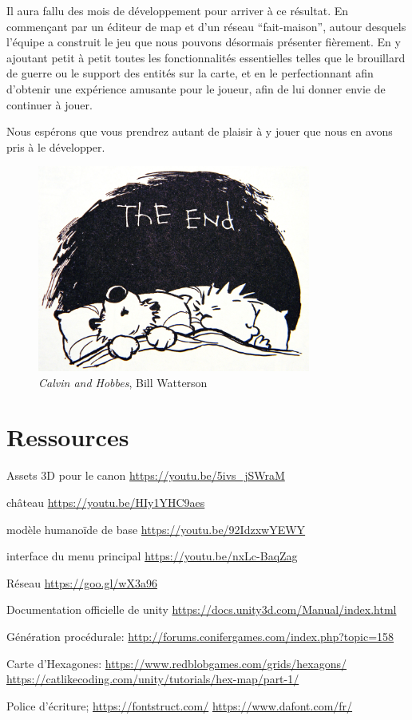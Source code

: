 \documentclass[12pt]{report}
\begin{document}
Il aura fallu des mois de développement pour arriver à ce résultat. En commençant
 par un éditeur de map et d’un réseau “fait-maison”, autour desquels l’équipe a
 construit le jeu que nous pouvons désormais présenter fièrement. En y ajoutant 
petit à petit toutes les fonctionnalités essentielles telles que le brouillard de guerre
 ou le support des entités sur la carte, et en le perfectionnant afin d’obtenir une
 expérience amusante pour le joueur, afin de lui donner envie de continuer à jouer.

Nous espérons que vous prendrez autant de plaisir à y jouer que nous en avons pris 
à le développer.


\begin{figure}
    \centering
    \includegraphics[width=0.8\textwidth]{project_mood}
    \caption*{\textit{Calvin and Hobbes}, Bill Watterson}
\end{figure}

\chapter{Ressources}

Assets 3D
pour le canon
\url{https://youtu.be/5ivs_jSWraM}

château
\url{https://youtu.be/HIy1YHC9aes}

modèle humanoïde de base
\url{https://youtu.be/92IdzxwYEWY}

interface du menu principal
\url{https://youtu.be/nxLc-BaqZag}

Réseau
\url{https://goo.gl/wX3a96}

Documentation officielle de unity
\url{https://docs.unity3d.com/Manual/index.html}

Génération procédurale:
\url{http://forums.conifergames.com/index.php?topic=158}

Carte d’Hexagones:
\url{https://www.redblobgames.com/grids/hexagons/}
\url{https://catlikecoding.com/unity/tutorials/hex-map/part-1/}

Police d’écriture;
\url{https://fontstruct.com/}
\url{https://www.dafont.com/fr/}
\end{document}
